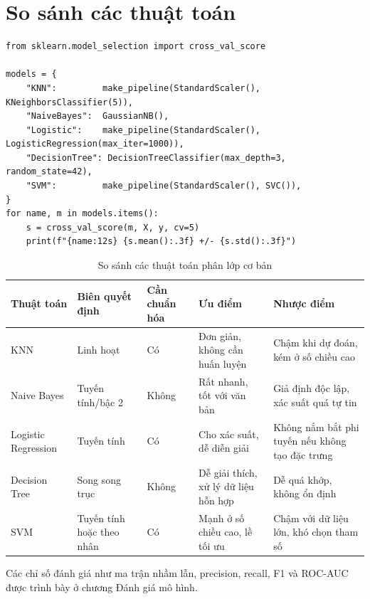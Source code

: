 \section{So sánh các thuật toán}

\begin{lstlisting}[caption={So sánh năm thuật toán bằng kiểm định chéo}]
from sklearn.model_selection import cross_val_score

models = {
    "KNN":         make_pipeline(StandardScaler(), KNeighborsClassifier(5)),
    "NaiveBayes":  GaussianNB(),
    "Logistic":    make_pipeline(StandardScaler(), LogisticRegression(max_iter=1000)),
    "DecisionTree": DecisionTreeClassifier(max_depth=3, random_state=42),
    "SVM":         make_pipeline(StandardScaler(), SVC()),
}
for name, m in models.items():
    s = cross_val_score(m, X, y, cv=5)
    print(f"{name:12s} {s.mean():.3f} +/- {s.std():.3f}")
\end{lstlisting}

\begin{table}[H]
\centering
\small
\begin{tabular}{|p{2.4cm}|p{2cm}|p{2cm}|p{3.4cm}|p{3.4cm}|}
\hline
\textbf{Thuật toán} & \textbf{Biên quyết định} & \textbf{Cần chuẩn hóa} & \textbf{Ưu điểm} & \textbf{Nhược điểm} \\
\hline
KNN & Linh hoạt & Có & Đơn giản, không cần huấn luyện & Chậm khi dự đoán, kém ở số chiều cao \\ \hline
Naive Bayes & Tuyến tính/bậc 2 & Không & Rất nhanh, tốt với văn bản & Giả định độc lập, xác suất quá tự tin \\ \hline
Logistic Regression & Tuyến tính & Có & Cho xác suất, dễ diễn giải & Không nắm bắt phi tuyến nếu không tạo đặc trưng \\ \hline
Decision Tree & Song song trục & Không & Dễ giải thích, xử lý dữ liệu hỗn hợp & Dễ quá khớp, không ổn định \\ \hline
SVM & Tuyến tính hoặc theo nhân & Có & Mạnh ở số chiều cao, lề tối ưu & Chậm với dữ liệu lớn, khó chọn tham số \\ \hline
\end{tabular}
\caption{So sánh các thuật toán phân lớp cơ bản}
\end{table}

Các chỉ số đánh giá như ma trận nhầm lẫn, precision, recall, F1 và ROC-AUC được trình bày ở chương Đánh giá mô hình.

